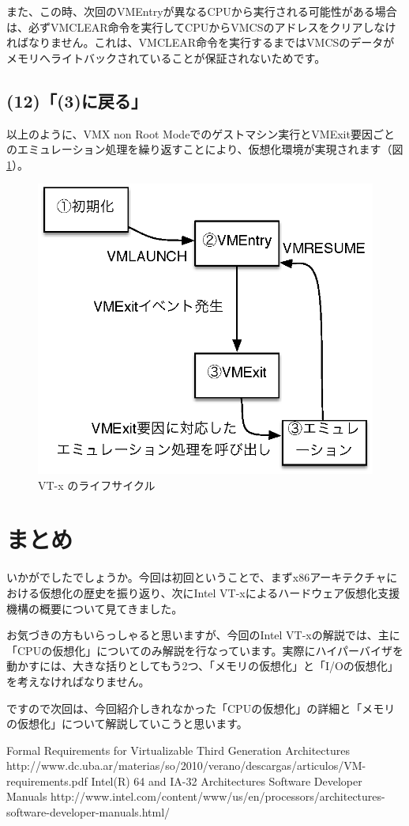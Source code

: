 \documentclass[a4j,12pt]{jarticle}
\begin{document}
また、この時、次回のVMEntryが異なるCPUから実行される可能性がある場合は、必ずVMCLEAR命令を実行してCPUからVMCSのアドレスをクリアしなければなりません。これは、VMCLEAR命令を実行するまではVMCSのデータがメモリへライトバックされていることが保証されないためです。

\subsection*{(12)「(3)に戻る」}
以上のように、VMX non Root Modeでのゲストマシン実行とVMExit要因ごとのエミュレーション処理を繰り返すことにより、仮想化環境が実現されます（図\ref{fig4}）。

\begin{figure}
\includegraphics{figures/part1_fig4.eps}
\caption{VT-x のライフサイクル}
\label{fig4}
\end{figure}

\section{まとめ}
いかがでしたでしょうか。今回は初回ということで、まずx86アーキテクチャにおける仮想化の歴史を振り返り、次にIntel VT-xによるハードウェア仮想化支援機構の概要について見てきました。

お気づきの方もいらっしゃると思いますが、今回のIntel VT-xの解説では、主に「CPUの仮想化」についてのみ解説を行なっています。実際にハイパーバイザを動かすには、大きな括りとしてもう2つ、「メモリの仮想化」と「I/Oの仮想化」を考えなければなりません。

ですので次回は、今回紹介しきれなかった「CPUの仮想化」の詳細と「メモリの仮想化」について解説していこうと思います。

\begin{thebibliography}{4}
   Formal Requirements for Virtualizable Third Generation Architectures http://www.dc.uba.ar/materias/so/2010/verano/descargas/articulos/VM-requirements.pdf
   Intel(R) 64 and IA-32 Architectures Software Developer Manuals http://www.intel.com/content/www/us/en/processors/architectures-software-developer-manuals.html/
\end{thebibliography}
\end{document}

